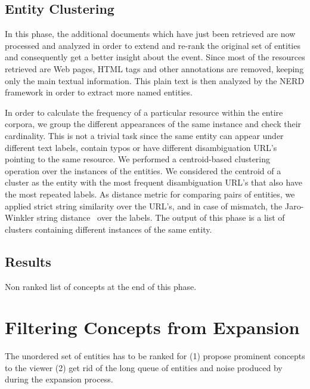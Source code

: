 \documentclass{llncs}
\begin{document}
\subsection{Entity Clustering}
In this phase, the additional documents which have just been retrieved are now processed and analyzed in order to extend and re-rank the original set of entities and consequently get a better insight about the event. Since most of the resources retrieved are Web pages, HTML tags and other annotations are removed, keeping only the main textual information. This plain text is then analyzed by the NERD framework in order to extract more named entities.

In order to calculate the frequency of a particular resource within the entire corpora, we group the different appearances of the same instance and check their cardinality. This is not a trivial task since the same entity can appear under different text labels, contain typos or have different disambiguation URL's pointing to the same resource. We performed a centroid-based clustering operation over the instances of the entities. We considered the centroid of a cluster as the entity with the most frequent disambiguation URL's that also have the most repeated labels. As distance metric for comparing pairs of entities, we applied strict string similarity over the URL's, and in case of mismatch, the Jaro-Winkler string distance~\cite{winkler2006overview} over the labels. The output of this phase is a list of clusters containing different instances of the same entity.

\subsection{Results}
Non ranked list of concepts at the end of this phase.

\section{Filtering Concepts from Expansion}
\label{sec:Filtering}

The unordered set of entities has to be ranked for (1) propose prominent concepts to the viewer (2) get rid of the long queue of entities and noise produced by during the expansion process.


\end{document}

